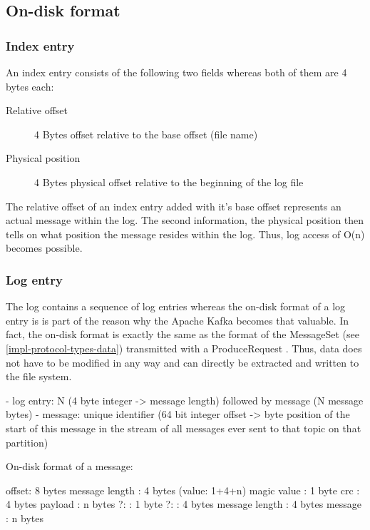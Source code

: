 \subsection{On-disk format}
\subsubsection{Index entry}
An index entry consists of the following two fields whereas both of them are 4 bytes each:

\begin{description}
    \item[Relative offset] 4 Bytes offset relative to the base offset (file name)
    \item[Physical position] 4 Bytes physical offset relative to the beginning of the log file
\end{description}

The relative offset of an index entry added with it's base offset represents an
actual message within the log. The second information, the physical position then tells on what 
position the message resides within the log. Thus, log access of O(n) becomes possible.

\subsubsection{Log entry}

The log contains a sequence of log entries whereas the on-disk format of a log
entry is is part of the reason why the Apache Kafka becomes that valuable. In
fact, the on-disk format is exactly the same as the format of the MessageSet
(see \ref{impl-protocol-types-data}) transmitted with a ProduceRequest
. Thus, data does not have to be
modified in any way and can directly be extracted and written to the file
system.

- log entry: N (4 byte integer -> message length) followed by message (N message bytes)
- message: unique identifier (64 bit integer offset -> byte position of the start of this message in the stream of all messages ever sent to that topic on that partition)

On-disk format of a message:

offset: 8 bytes
message length : 4 bytes (value: 1+4+n) 
magic value  : 1 byte
crc            : 4 bytes
payload        : n bytes
    ?:              : 1 byte
    ?:              : 4 bytes
    message length  : 4 bytes
    message         : n bytes

